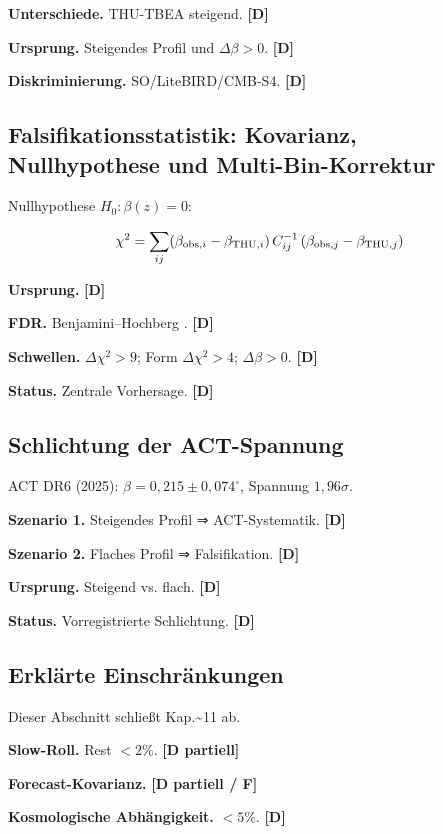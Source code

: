 ﻿\documentclass[11pt,letterpaper]{article}
\begin{document}
\textbf{Unterschiede.} THU-TBEA steigend. \textbf{[D]}

\textbf{Ursprung.} Steigendes Profil und $\Delta\beta > 0$. \textbf{[D]}

\textbf{Diskriminierung.} SO/LiteBIRD/CMB-S4. \textbf{[D]}
\subsection{Falsifikationsstatistik: Kovarianz, Nullhypothese und Multi-Bin-Korrektur}
Nullhypothese $H_0: \beta(z) = 0$:

\begin{equation*}
  \resizebox{\ifdim\width>\linewidth \linewidth\else\width\fi}{!}{$\displaystyle \chi^2 = \sum_{ij} (\beta_{\text{obs},i} - \beta_{\text{THU},i})\,C_{ij}^{-1}\,(\beta_{\text{obs},j} - \beta_{\text{THU},j})$}
\end{equation*}

\textbf{Ursprung.} \textbf{[D]}

\textbf{FDR.} Benjamini--Hochberg \cite{BenjaminiHochberg1995}. \textbf{[D]}

\textbf{Schwellen.} $\Delta\chi^2 > 9$; Form $\Delta\chi^2 > 4$; $\Delta\beta > 0$. \textbf{[D]}

\textbf{Status.} Zentrale Vorhersage. \textbf{[D]}
\subsection{Schlichtung der ACT-Spannung}
ACT DR6 (2025): $\beta = 0{,}215 \pm 0{,}074^\circ$, Spannung $1{,}96\sigma$.

\textbf{Szenario 1.} Steigendes Profil ⇒ ACT-Systematik. \textbf{[D]}

\textbf{Szenario 2.} Flaches Profil ⇒ Falsifikation. \textbf{[D]}

\textbf{Ursprung.} Steigend vs. flach. \textbf{[D]}

\textbf{Status.} Vorregistrierte Schlichtung. \textbf{[D]}
\subsection{Erklärte Einschränkungen}
Dieser Abschnitt schließt Kap.\textasciitilde{}11 ab.

\textbf{Slow-Roll.} Rest $< 2\%$. \textbf{[D partiell]}

\textbf{Forecast-Kovarianz.} \textbf{[D partiell / F]}

\textbf{Kosmologische Abhängigkeit.} $< 5\%$. \textbf{[D]}
\end{document}
